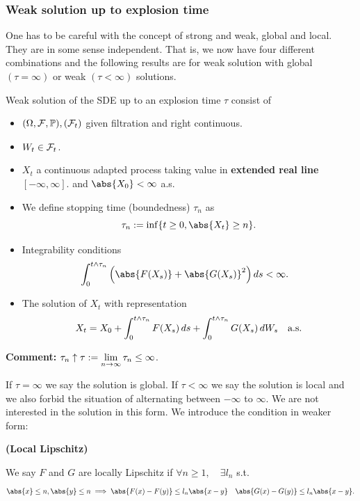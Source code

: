 \subsubsection{Weak solution up to explosion time}
One has to be careful with the concept of strong and weak, global and local. They are in some sense independent. That is, we now have four different combinations and the following results are for weak solution with global $(\tau = \infty)$ or weak $(\tau < \infty)$ solutions.
\begin{dfn}
Weak solution of the SDE up to an explosion time $\tau$ consist of
\begin{itemize}
    \item $(\Omega, \mathcal{F}, \mathbb{P}), (\mathcal{F}_t)$ given filtration and right continuous.
    \item $W_t \in \mathcal{F}_t$.
    \item $X_t$ a continuous adapted process taking value in \textbf{extended real line $[-\infty, \infty]$}. and $\abs{X_0} < \infty$ a.s.
    \item We define stopping time (boundedness) $\tau_n$ as 
    \begin{equation*}
        \tau_n := \inf\{t\geq0, \abs{X_t} \geq n\}.
    \end{equation*}
    \item Integrability conditions
    \begin{align*}
        &\int_0^{t \wedge \tau_n} \left(\abs{F(X_s)} + \abs{G(X_s)}^2 \right)\diff s <\infty.
    \end{align*}
    \item The solution of $X_t$ with representation
    \begin{equation*}
        X_t = X_0 + \int_0^{t \wedge \tau_n} F(X_s) \mathop{}\!d s + \int_0^{t \wedge \tau_n} G(X_s) \mathop{}\!d W_s \quad \text{a.s.}
    \end{equation*}
\end{itemize}
\end{dfn}

\textbf{Comment:} $\tau_n \uparrow \tau := \lim\limits_{n\rightarrow \infty }\tau_n \leq \infty$.

If $\tau = \infty$ we say the solution is global. If $\tau <\infty$ we say the solution is local and we also forbid the situation of alternating between $-\infty$ to $\infty$. We are not interested in the solution in this form. We introduce the condition in weaker form:

\begin{dfn}{\textbf{(Local Lipschitz)}}

We say $F$ and $G$ are locally Lipschitz if $\forall n \geq 1, \quad \exists l_n$ s.t.
\begin{equation*}
    \abs{x}\leq n, \abs{y}\leq n \implies \abs{F(x) - F(y)} \leq l_n \abs{x-y} \quad \abs{G(x) - G(y)} \leq l_n \abs{x-y}.
\end{equation*}
\end{dfn}

